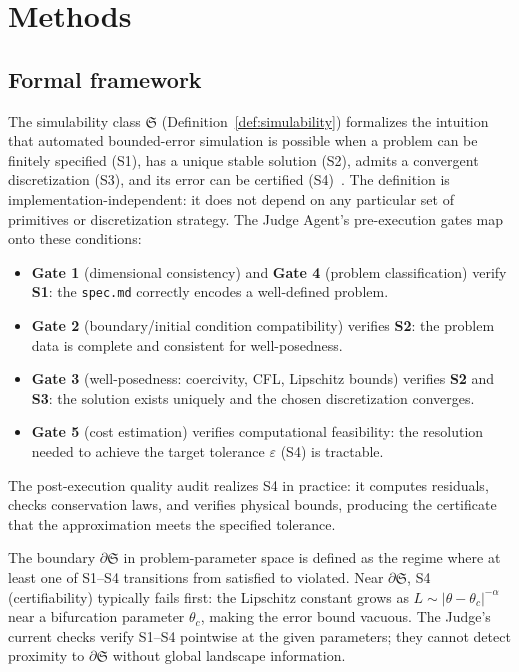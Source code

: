 \documentclass[11pt,a4paper]{article}
\newcommand{\Sclass}{\mathfrak{S}}
\begin{document}
\section{Methods}

\subsection{Formal framework}

The simulability class $\Sclass$ (Definition~\ref{def:simulability}) formalizes the intuition that automated bounded-error simulation is possible when a problem can be finitely specified (S1), has a unique stable solution (S2), admits a convergent discretization (S3), and its error can be certified (S4)~\cite{boldo2015verified}. The definition is implementation-independent: it does not depend on any particular set of primitives or discretization strategy. The Judge Agent's pre-execution gates map onto these conditions:

\begin{itemize}[nosep,leftmargin=1.5em]
\item \textbf{Gate 1} (dimensional consistency) and \textbf{Gate 4} (problem classification) verify \textbf{S1}: the \texttt{spec.md} correctly encodes a well-defined problem.
\item \textbf{Gate 2} (boundary/initial condition compatibility) verifies \textbf{S2}: the problem data is complete and consistent for well-posedness.
\item \textbf{Gate 3} (well-posedness: coercivity, CFL, Lipschitz bounds) verifies \textbf{S2} and \textbf{S3}: the solution exists uniquely and the chosen discretization converges.
\item \textbf{Gate 5} (cost estimation) verifies computational feasibility: the resolution needed to achieve the target tolerance $\varepsilon$ (S4) is tractable.
\end{itemize}

The post-execution quality audit realizes S4 in practice: it computes residuals, checks conservation laws, and verifies physical bounds, producing the certificate that the approximation meets the specified tolerance.

The boundary $\partial \Sclass$ in problem-parameter space is defined as the regime where at least one of S1--S4 transitions from satisfied to violated. Near $\partial \Sclass$, S4 (certifiability) typically fails first: the Lipschitz constant grows as $L \sim |\theta - \theta_c|^{-\alpha}$ near a bifurcation parameter $\theta_c$, making the error bound vacuous. The Judge's current checks verify S1--S4 pointwise at the given parameters; they cannot detect proximity to $\partial \Sclass$ without global landscape information.
\end{document}
